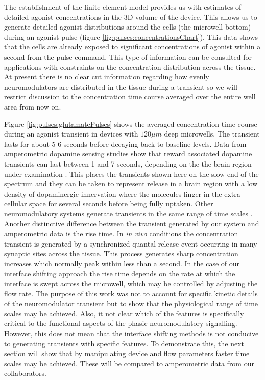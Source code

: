   The establishment of the finite element model provides us with estimates of detailed agonist concentrations in the 3D volume of the device. This allows us to generate detailed agonist distributions around the cells (the microwell bottom) during an agonist pulse (figure \ref{fig:pulses:concentrationsChart}). This data shows that the cells are already exposed to significant concentrations of agonist within a second from the pulse command. This type of information can be consulted for applications with constraints on the concentration distribution across the tissue. At present there is no clear cut information regarding how evenly neuromodulators are distributed in the tissue during a transient so we will restrict discussion to the concentration time course averaged over the entire well area from now on. 
  
  Figure \ref{fig:pulses:glutamatePulses} shows the averaged concentration time course during an agonist transient in devices with \(120 \mu m\) deep microwells. The transient lasts for about 5-6 seconds before decaying back to baseline levels. Data from amperometric dopamine sensing studies show that reward associated dopamine transients can last between 1 and 7 seconds, depending on the the brain region under examination \cite{mittleman2008cerebellar,phillips2003subsecond,venton2003real}. This places the transients shown here on the slow end of the spectrum and they can be taken to represent release in a brain region with a low density of dopaminergic innervation where the molecules linger in the extra cellular space for several seconds before being fully uptaken. Other neuromodulatory systems generate transients in the same range of time scales \cite{dankoski2015monitoring,dugast2002vivo,sarter2009phasic}. Another distinctive difference between the transient generated by our system and amperometric data is the rise time. In \textit{in vivo} conditions the concentration transient is generated by a synchronized quantal release event occurring in many synaptic sites across the tissue. This process generates sharp concentration increases which normally peak within less than a second. In the case of our interface shifting approach the rise time depends on the rate at which the interface is swept across the microwell, which may be controlled by adjusting the flow rate. The purpose of this work was not to account for specific kinetic details of the neuromodulator transient but to show that the physiological range of time scales may be achieved. Also, it not clear which of the features is specifically critical to the functional aspects of the phasic neuromodulatory signalling. However, this does not mean that the interface shifting methods is not conducive to generating transients with specific features. To demonstrate this, the next section will show that by manipulating device and flow parameters faster time scales may be achieved. These will be compared to amperometric data from our collaborators.

